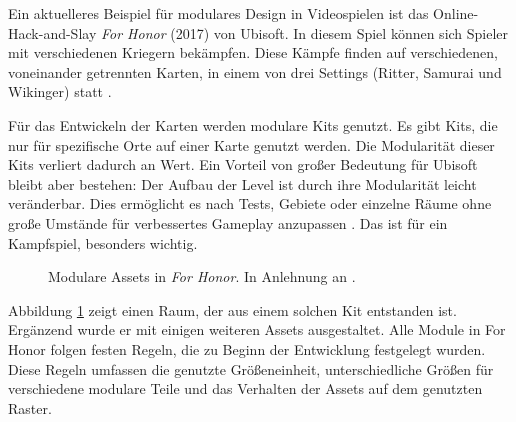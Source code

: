 \par
Ein aktuelleres Beispiel für modulares Design in Videospielen ist das Online-Hack-and-Slay \textit{For Honor} (2017) von Ubisoft. In diesem Spiel können sich Spieler mit verschiedenen Kriegern bekämpfen. Diese Kämpfe finden auf verschiedenen, voneinander getrennten Karten, in einem von drei Settings (Ritter, Samurai und Wikinger) statt \parencite{ForHonorMapTypes}.
\par
Für das Entwickeln der Karten werden modulare Kits genutzt. Es gibt Kits, die nur für spezifische Orte auf einer Karte genutzt werden. Die Modularität dieser Kits verliert dadurch an Wert. Ein Vorteil von großer Bedeutung für Ubisoft bleibt aber bestehen: Der Aufbau der Level ist durch ihre Modularität leicht veränderbar. Dies ermöglicht es nach Tests, Gebiete oder einzelne Räume ohne große Umstände für verbessertes Gameplay anzupassen \parencite{ForHonor}. Das ist für ein Kampfspiel, besonders wichtig.
\begin{figure}[H]
\centering
  \caption{Modulare Assets in \textit{For Honor}. In Anlehnung an \parencite{ForHonor}.}
\label{ForHonorImage}
\end{figure}
\vspace{-10.5pt}
Abbildung \ref{ForHonorImage} zeigt einen Raum, der aus einem solchen Kit entstanden ist. Ergänzend wurde er mit einigen weiteren Assets ausgestaltet. Alle Module in For Honor folgen festen Regeln, die zu Beginn der Entwicklung festgelegt wurden.  Diese Regeln umfassen die genutzte Größeneinheit, unterschiedliche Größen für verschiedene modulare Teile und das Verhalten der Assets auf dem genutzten Raster. \parencite{ForHonor}
\par
